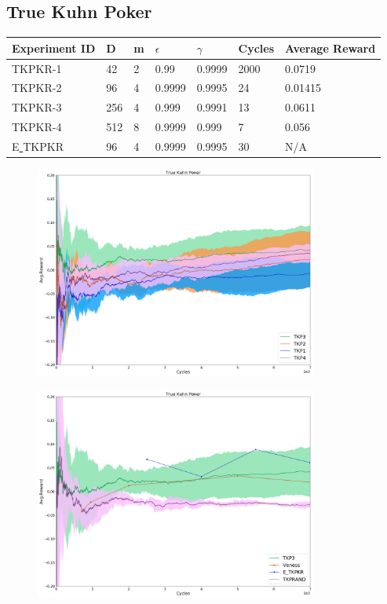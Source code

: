 \documentclass{article}
\theoremstyle{definition}
\newtheorem{primary statistics}[definition]{Primary Statistics}
\newtheorem{auxiliary statistics}[definition]{Auxiliary Statistics}
\begin{document}
\newpage

\subsection{True Kuhn Poker}
\begin{tabular}{|l|l|l|l|l|l|l|}
\hline \centering
 Experiment ID& D & m & $\epsilon$ & $\gamma$ & Cycles & Average Reward \\ \hline
TKPKR-1  & 42        & 2           & 0.99        & 0.9999            & 2000   & 0.0719        \\ \hline
TKPKR-2  & 96        & 4           & 0.9999      & 0.9995            & 24     & 0.01415         \\ \hline
TKPKR-3  & 256       & 4           & 0.999       & 0.9991            & 13     & 0.0611         \\ \hline
TKPKR-4  & 512       & 8           & 0.9999      & 0.999             & 7      & 0.056      \\ \hline 
E\underline{ }TKPKR  & 96       & 4           & 0.9999      & 0.9995             & 30      & N/A      \\ \hline        
\end{tabular}


 \begin{figure}[h]
 \centering
    \includegraphics[width=9.3cm]{4_True_Kuhn_Poker}
\end{figure}

 \begin{figure}[h]
 \centering
    \includegraphics[width=9.3cm]{True_Kuhn_Poker}
\end{figure}
\end{document}
